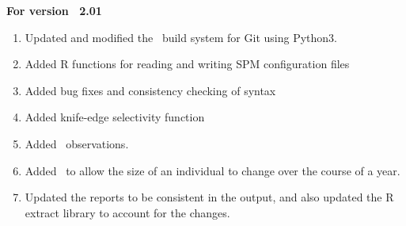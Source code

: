 \textbf{For version \SPM\ 2.01}

\begin{enumerate}
  \item Updated and modified the \SPM\ build system for Git using Python3.
  \item Added R functions for reading and writing SPM configuration files
	\item Added bug fixes and consistency checking of syntax
	\item Added knife-edge selectivity function
  \item Added\  observations.
  \item Added\  to allow the size of an individual to change over the course of a year.	
  \item Updated the reports to be consistent in the output, and also updated the R extract library to account for the changes.
\end{enumerate}


